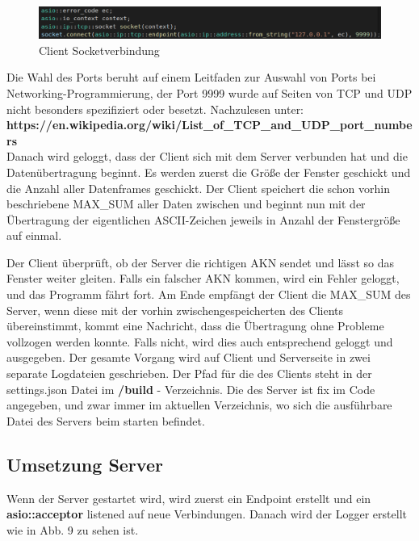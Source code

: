\documentclass{article}
\begin{document}
\begin{center}
\begin{figure}[h]
    \centering
    \includegraphics[width=\textwidth]{clientep.png}
    \caption{Client Socketverbindung}
\end{figure}
\end{center}

Die Wahl des Ports beruht auf einem Leitfaden zur Auswahl von Ports bei Networking-Programmierung, der Port 9999 wurde auf Seiten von TCP und UDP nicht besonders spezifiziert oder besetzt. Nachzulesen unter:\\ \textbf{https://en.wikipedia.org/wiki/List\_of\_TCP\_and\_UDP\_port\_numbers}
\\
\newline
Danach wird geloggt, dass der Client sich mit dem Server verbunden hat und die Datenübertragung beginnt. Es werden zuerst die Größe der Fenster geschickt und die Anzahl aller Datenframes geschickt. Der Client speichert die schon vorhin beschriebene MAX\_SUM aller Daten zwischen und beginnt nun mit der Übertragung der eigentlichen ASCII-Zeichen jeweils in Anzahl der Fenstergröße auf einmal.

Der Client überprüft, ob der Server die richtigen AKN sendet und lässt so das Fenster weiter gleiten. Falls ein falscher AKN kommen, wird ein Fehler geloggt, und das Programm fährt fort. Am Ende empfängt der Client die MAX\_SUM des Server, wenn diese mit der vorhin zwischengespeicherten des Clients übereinstimmt, kommt eine Nachricht, dass die Übertragung ohne Probleme vollzogen werden konnte. Falls nicht, wird dies auch entsprechend geloggt und ausgegeben. Der gesamte Vorgang wird auf Client und Serverseite in zwei separate Logdateien geschrieben. Der Pfad für die des Clients steht in der settings.json Datei im \textbf{/build} - Verzeichnis. Die des Server ist fix im Code angegeben, und zwar immer im aktuellen Verzeichnis, wo sich die ausführbare Datei des Servers beim starten befindet.

\subsection{Umsetzung Server}

Wenn der Server gestartet wird, wird zuerst ein Endpoint erstellt und ein \textbf{asio::acceptor} listened auf neue Verbindungen. Danach wird der Logger erstellt wie in Abb. 9 zu sehen ist.
\end{document}
